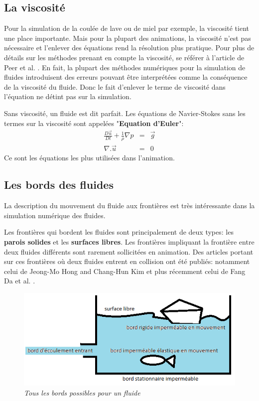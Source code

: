 \documentclass[11pt]{article}
\begin{document}
\subsection{La viscosité}	

Pour la simulation de la coulée de lave ou de miel par exemple, la viscosité tient une place importante. Mais pour la plupart des animations, la viscosité n'est pas nécessaire et l'enlever des équations rend la résolution plus pratique. Pour plus de détails sur les méthodes prenant en compte la viscosité, se référer à l'article de Peer et al. \cite{peer-2015}. En fait, la plupart des méthodes numériques pour la simulation de fluides introduisent des erreurs pouvant être interprétées comme la conséquence de la viscosité du fluide. Donc le fait d'enlever le terme de viscosité dans l'équation ne détint pas sur la simulation. 

Sans viscosité, un fluide est dit parfait. Les équations de Navier-Stokes sans les termes sur la viscosité sont appelées "\textbf{Equation d'Euler}":
	\begin{eqnarray}
	\frac{D\overrightarrow{u}}{Dt} + \frac{1}{\rho} \nabla p & = & \overrightarrow{g} \\
	\nabla . \overrightarrow{u} & = & 0
	\end{eqnarray}
Ce sont les équations les plus utilisées dans l'animation.

\subsection{Les bords des fluides}	

La description du mouvement du fluide aux frontières est très intéressante dans la simulation numérique des fluides. 

Les frontières qui bordent les fluides sont principalement de deux types: les \textbf{parois solides} et les \textbf{surfaces libres}. Les frontières impliquant la frontière entre deux fluides différents sont rarement sollicitées en animation. Des articles portant sur ces frontières où deux fluides entrent en collision ont été publiés: notamment celui de Jeong-Mo Hong and Chang-Hun Kim \cite{Hong-05} et plus récemment celui de Fang Da et al. \cite{da-2016}.

\begin{figure}[!htbp]
\centering
\includegraphics[scale=0.5]{bords.png}
\caption{\textit{Tous les bords possibles pour un fluide}}
\label{figure/boundaries}
\end{figure}
\end{document}
